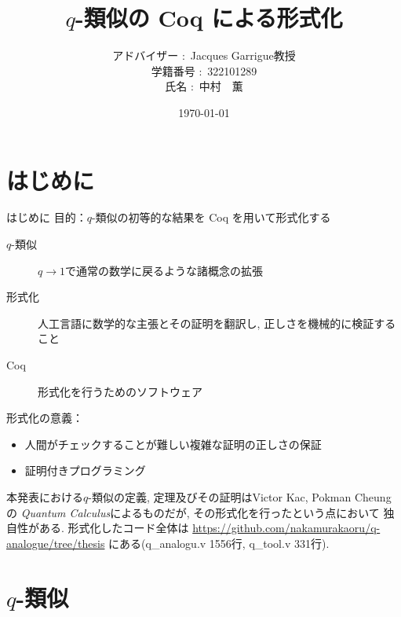 \documentclass[dvipdfmx,cjk]{beamer}
\theoremstyle{mystyle}
\newcommand{\0}{\textbf{0}}
\begin{document}
\title{$q$-類似の Coq による形式化}
\author[中村　薫]{アドバイザー $\colon$ Jacques Garrigue教授\\
           学籍番号 $\colon$ 322101289\\
           氏名 $\colon$ 中村　薫}
\date{\today}
\maketitle
\begin{frame}
\tableofcontents
\end{frame}
\section{はじめに}

\begin{frame}
  \tableofcontents[currentsection] 
\end{frame}

\begin{frame}[fragile]{はじめに}
	目的：$q$-類似の初等的な結果を Coq を用いて形式化する \pause
 	\begin{description}
 		\item[$q$-類似] $q \to 1$で通常の数学に戻るような諸概念の拡張 \pause
		\item[形式化] 人工言語に数学的な主張とその証明を翻訳し, 
		正しさを機械的に検証すること \pause
		\item[Coq] 形式化を行うためのソフトウェア \pause
	\end{description}
	形式化の意義： \pause
	\begin{itemize}
		\item 人間がチェックすることが難しい複雑な証明の正しさの保証 \pause
		\item 証明付きプログラミング \pause
	\end{itemize}
	本発表における$q$-類似の定義, 定理及びその証明はVictor Kac, Pokman Cheungの
	{\it Quantum Calculus}\cite{Kac}によるものだが, その形式化を行ったという点において
	独自性がある. 形式化したコード全体は
	\url{https://github.com/nakamurakaoru/q-analogue/tree/thesis}\cite{coq qana}
	にある(q\_analogu.v 1556行, q\_tool.v 331行).
\end{frame}
\section{$q$-類似}
\end{document}
